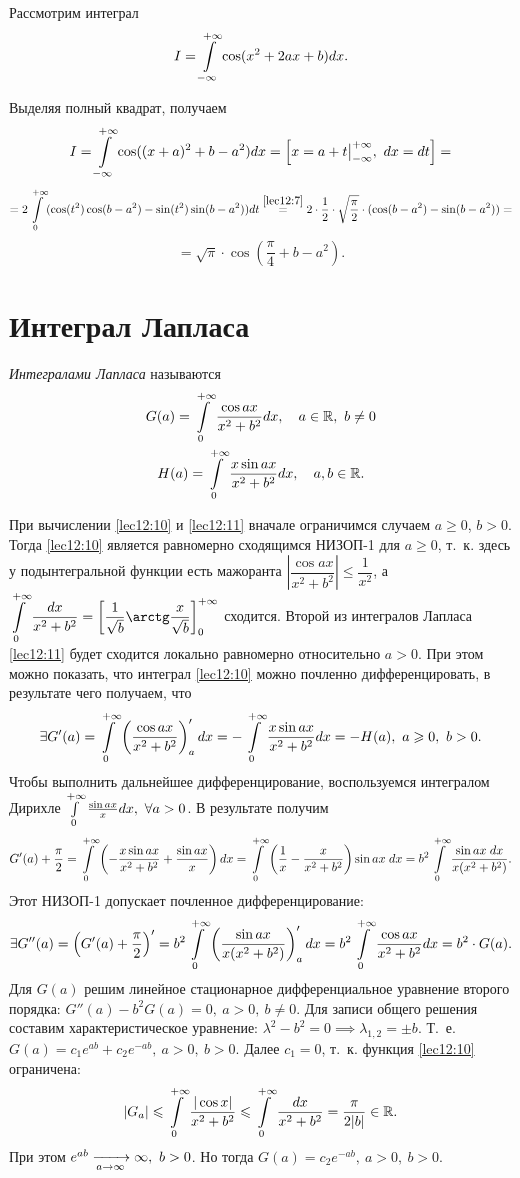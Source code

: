 \documentclass[../../main.tex]{subfiles}
\begin{document}
\begin{exmp}
Рассмотрим интеграл \[I = \int\limits_{-\infty}^{+\infty} \cos(x^2 + 2ax + b) dx.\]

Выделяя полный квадрат, получаем \[I = \int\limits_{-\infty}^{+\infty} \cos((x+a)^2 + b - a^2)dx = 
\left[x = a + t\big|_{-\infty}^{+\infty},\ dx = dt\right] =\]\[= 2 \ioinf 
(\cos(t^2)\cos(b-a^2) - \sin(t^2)\sin(b-a^2)) dt \stk{lec12:7}= 
2\cdot\frac12\cdot \sqrt{\frac\pi2} \cdot (\cos(b - a^2) - \sin(b - a^2)) 
=\]\[ = \sqrt{\pi} \cdot\cos\left(\frac{\pi}4 + b - a^2\right).\]
\end{exmp}

\section{Интеграл Лапласа}

\emph{Интегралами Лапласа} называются
\begin{gather}
\label{lec12:10}
G(a) = \int\limits_{0}^{+\infty} \frac{\cos ax}{x^2 + b^2} dx,\quad a \in \mathbb{R},\ b \ne 0 \\
\label{lec12:11}
H(a) = \int\limits_{0}^{+\infty} \frac{x\sin ax}{x^2 + b^2} dx,\quad a, b \in \mathbb{R}. 
\end{gather}

При вычислении \eqref{lec12:10} и \eqref{lec12:11} вначале ограничимся случаем 
$a \ge 0$, $b > 0$. Тогда \eqref{lec12:10} является равномерно сходящимся 
НИЗОП-1 для $a \ge 0$, т.~к. здесь у подынтегральной функции есть мажоранта 
$\left|\dfrac{\cos{ax}}{x^2 + b^2}\right| \le \dfrac1{x^2}$, а 
$\displaystyle\ioinf \frac{dx}{x^2 + b^2} = \left[\frac1{\sqrt b}\arctg\frac 
x{\sqrt b}\right]_0^{+\infty}$ сходится. Второй из интегралов Лапласа 
\eqref{lec12:11} будет сходится локально равномерно относительно $a > 0$. При 
этом можно показать, что интеграл \eqref{lec12:10}  можно почленно 
дифференцировать, в результате чего получаем, что
\[\exists G'(a) = \int\limits_{0}^{+\infty} \left(\frac{\cos ax}{x^2 + b^2}\right)'_a dx = 
-\int\limits_{0}^{+\infty} \frac{x\sin ax}{x^2+b^2} dx = -H(a),\ a \geqslant 0,\ b > 0.\]
Чтобы выполнить дальнейшее дифференцирование, воспользуемся интегралом Дирихле 
$\int\limits_{0}^{+\infty} \frac{\sin ax}x dx,\ \forall a > 0$. В результате получим \[G'(a) + 
\frac\pi2 = \int\limits_{0}^{+\infty} \left(-\frac{x \sin ax}{x^2 + b^2} + \frac{\sin 
ax}{x}\right)dx = \int\limits_{0}^{+\infty} \left(\frac1x - \frac{x}{x^2+b^2}\right)\sin ax\;dx = 
b^2 \int\limits_{0}^{+\infty} \frac{\sin ax\;dx}{x(x^2 + b^2)}.\]
Этот НИЗОП-1 допускает почленное дифференцирование:
\[\exists G''(a) = \left(G'(a) + \frac{\pi}2\right)' = b^2 \int\limits_{0}^{+\infty} 
\left(\frac{\sin ax} {x(x^2 + b^2)}\right)'_a dx = b^2 \int\limits_{0}^{+\infty} \frac{\cos ax} 
{x^2 + b^2} dx = b^2\cdot G(a).\]
Для $G(a)$ решим линейное стационарное дифференциальное уравнение второго 
порядка: $G''(a) - b^2G(a) = 0,\ a > 0,\ b \ne 0$. Для записи общего решения 
составим характеристическое уравнение: $\lambda^2 - b^2 = 0 \implies 
\lambda_{1, 2} = \pm b$. Т.~е. $G(a) = c_1e^{ab} + c_2e^{-ab},\ a > 0,\ b > 
0$. Далее $c_1 = 0$, т.~к. функция \eqref{lec12:10} ограничена:
\[|G_a| \leqslant \int\limits_{0}^{+\infty} \frac{|\cos x|}{x^2 + b^2} \leqslant \int\limits_{0}^{+\infty} \frac{dx}{x^2 + b^2} 
= \frac\pi{2|b|} \in \mathbb{R}.\] При этом $e^{ab} \xrightarrow[a\to \infty]{} \infty,\ b>0$. 
Но тогда $G(a) = c_2e^{-ab},\ a > 0,\ b > 0$.
\end{document}
